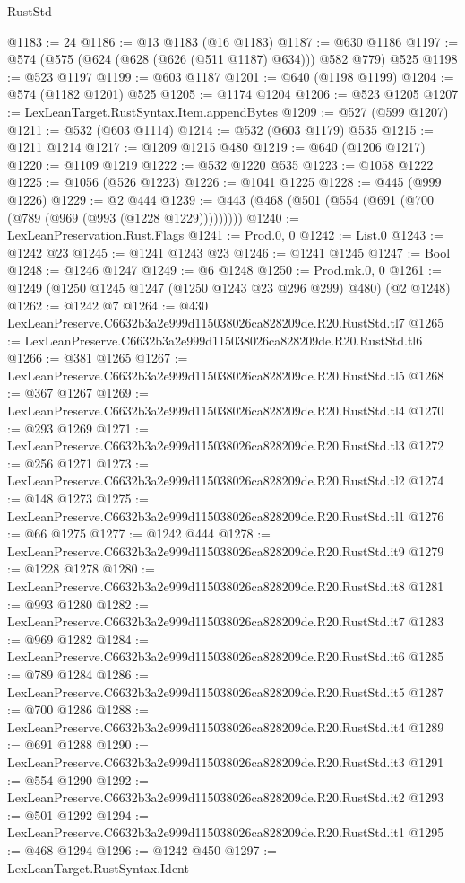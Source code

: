 \begin{lexlean}{RustStd}
\begin{coremodule}
@1183 := 24
@1186 := @13 @1183 (@16 @1183)
@1187 := @630 @1186
@1197 := @574 (@575 (@624 (@628 (@626 (@511 @1187) @634))) @582 @779) @525
@1198 := @523 @1197
@1199 := @603 @1187
@1201 := @640 (@1198 @1199)
@1204 := @574 (@1182 @1201) @525
@1205 := @1174 @1204
@1206 := @523 @1205
@1207 := LexLeanTarget.RustSyntax.Item.appendBytes
@1209 := @527 (@599 @1207)
@1211 := @532 (@603 @1114)
@1214 := @532 (@603 @1179) @535
@1215 := @1211 @1214
@1217 := @1209 @1215 @480
@1219 := @640 (@1206 @1217)
@1220 := @1109 @1219
@1222 := @532 @1220 @535
@1223 := @1058 @1222
@1225 := @1056 (@526 @1223)
@1226 := @1041 @1225
@1228 := @445 (@999 @1226)
@1229 := @2 @444
@1239 := @443 (@468 (@501 (@554 (@691 (@700 (@789 (@969 (@993 (@1228 @1229)))))))))
@1240 := LexLeanPreservation.Rust.Flags
@1241 := Prod.{0, 0}
@1242 := List.{0}
@1243 := @1242 @23
@1245 := @1241 @1243 @23
@1246 := @1241 @1245
@1247 := Bool
@1248 := @1246 @1247
@1249 := @6 @1248
@1250 := Prod.mk.{0, 0}
@1261 := @1249 (@1250 @1245 @1247 (@1250 @1243 @23 @296 @299) @480) (@2 @1248)
@1262 := @1242 @7
@1264 := @430 LexLeanPreserve.C6632b3a2e999d115038026ca828209de.R20.RustStd.tl7
@1265 := LexLeanPreserve.C6632b3a2e999d115038026ca828209de.R20.RustStd.tl6
@1266 := @381 @1265
@1267 := LexLeanPreserve.C6632b3a2e999d115038026ca828209de.R20.RustStd.tl5
@1268 := @367 @1267
@1269 := LexLeanPreserve.C6632b3a2e999d115038026ca828209de.R20.RustStd.tl4
@1270 := @293 @1269
@1271 := LexLeanPreserve.C6632b3a2e999d115038026ca828209de.R20.RustStd.tl3
@1272 := @256 @1271
@1273 := LexLeanPreserve.C6632b3a2e999d115038026ca828209de.R20.RustStd.tl2
@1274 := @148 @1273
@1275 := LexLeanPreserve.C6632b3a2e999d115038026ca828209de.R20.RustStd.tl1
@1276 := @66 @1275
@1277 := @1242 @444
@1278 := LexLeanPreserve.C6632b3a2e999d115038026ca828209de.R20.RustStd.it9
@1279 := @1228 @1278
@1280 := LexLeanPreserve.C6632b3a2e999d115038026ca828209de.R20.RustStd.it8
@1281 := @993 @1280
@1282 := LexLeanPreserve.C6632b3a2e999d115038026ca828209de.R20.RustStd.it7
@1283 := @969 @1282
@1284 := LexLeanPreserve.C6632b3a2e999d115038026ca828209de.R20.RustStd.it6
@1285 := @789 @1284
@1286 := LexLeanPreserve.C6632b3a2e999d115038026ca828209de.R20.RustStd.it5
@1287 := @700 @1286
@1288 := LexLeanPreserve.C6632b3a2e999d115038026ca828209de.R20.RustStd.it4
@1289 := @691 @1288
@1290 := LexLeanPreserve.C6632b3a2e999d115038026ca828209de.R20.RustStd.it3
@1291 := @554 @1290
@1292 := LexLeanPreserve.C6632b3a2e999d115038026ca828209de.R20.RustStd.it2
@1293 := @501 @1292
@1294 := LexLeanPreserve.C6632b3a2e999d115038026ca828209de.R20.RustStd.it1
@1295 := @468 @1294
@1296 := @1242 @450
@1297 := LexLeanTarget.RustSyntax.Ident

\end{coremodule}
\end{lexlean}
